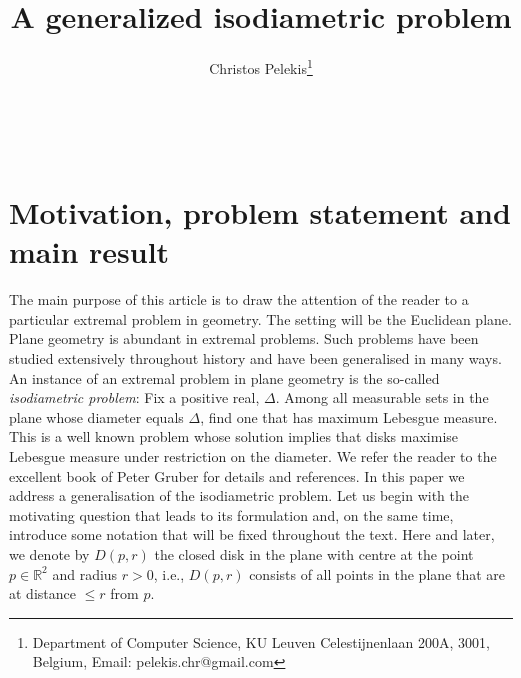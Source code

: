 \documentclass[12pt]{article}
\title{A generalized isodiametric problem}
\author{Christos Pelekis\thanks{Department of Computer Science, KU Leuven
Celestijnenlaan 200A,
3001, Belgium, Email: pelekis.chr@gmail.com}}
\begin{document}
\maketitle


\\

\section{Motivation, problem statement and main result}


The main purpose of this article is to draw the attention of the reader to a 
particular extremal problem in geometry.
The setting will be the Euclidean plane.  Plane geometry is abundant in extremal problems. 
Such problems have been studied extensively throughout history and have been generalised in many ways.
An instance of an extremal problem in plane geometry is the so-called \emph{isodiametric problem}: 
Fix a positive real, $\Delta$. 
Among all measurable sets in the plane whose
diameter equals $\Delta$, find one that has maximum Lebesgue measure. 
This is a well known problem whose solution implies that disks maximise Lebesgue measure 
under restriction on the diameter.
We refer the reader to the excellent book of Peter 
Gruber \cite{Gruber} for details and 
references.
In this paper we address a generalisation of the isodiametric problem. Let us begin
with the motivating question that leads to its formulation and, on the same time, 
introduce some notation 
that will be fixed throughout the text. 
Here and later, we denote by $D(p,r)$  the closed disk in the plane with centre at the point 
$p\in\mathbb{R}^2$ and radius $r>0$, i.e., 
$D(p,r)$ consists of all points in the plane that are at distance $\leq r$ from $p$.  
\end{document}
